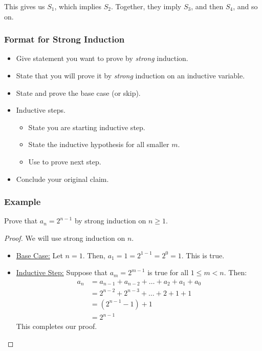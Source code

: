 \documentclass[letterpaper]{article}
\begin{document}
This gives us $S_1$, which implies $S_2$. Together, they imply $S_3$, and then $S_4$, and so on.

\subsubsection{Format for Strong Induction}
\begin{itemize}
    \item Give statement you want to prove by \emph{strong} induction.
    \item State that you will prove it by \emph{strong} induction on an inductive variable.
    \item State and prove the base case (or skip).
    \item Inductive steps.
    \begin{itemize}
        \item State you are starting inductive step.
        \item State the inductive hypothesis for all smaller $m$.
        \item Use to prove next step.
    \end{itemize}
    \item Conclude your original claim.
\end{itemize}

\subsubsection{Example}
Prove that $a_n = 2^{n - 1}$ by strong induction on $n \geq 1$. 

\begin{proof}
    We will use strong induction on $n$.
    \begin{itemize}
        \item[\mdiamond] \underline{Base Case:} Let $n = 1$. Then, $a_1 = 1 = 2^{1 - 1} = 2^0 = 1$. This is true.
        \item[\mdiamond] \underline{Inductive Step:} Suppose that $a_m = 2^{m - 1}$ is true for all $1 \leq m < n$. Then:
        \begin{equation*}
            \begin{aligned}
                a_n &= a_{n - 1} + a_{n - 2} + \dots + a_2 + a_1 + a_0 \\ 
                    &= 2^{n - 2} + 2^{n - 3} + \dots + 2 + 1 + 1 \\ 
                    &= (2^{n - 1} - 1) + 1 \\
                    &= 2^{n - 1}
            \end{aligned}        
        \end{equation*}  
        This completes our proof. \qedhere 
    \end{itemize}
\end{proof}
\end{document}
